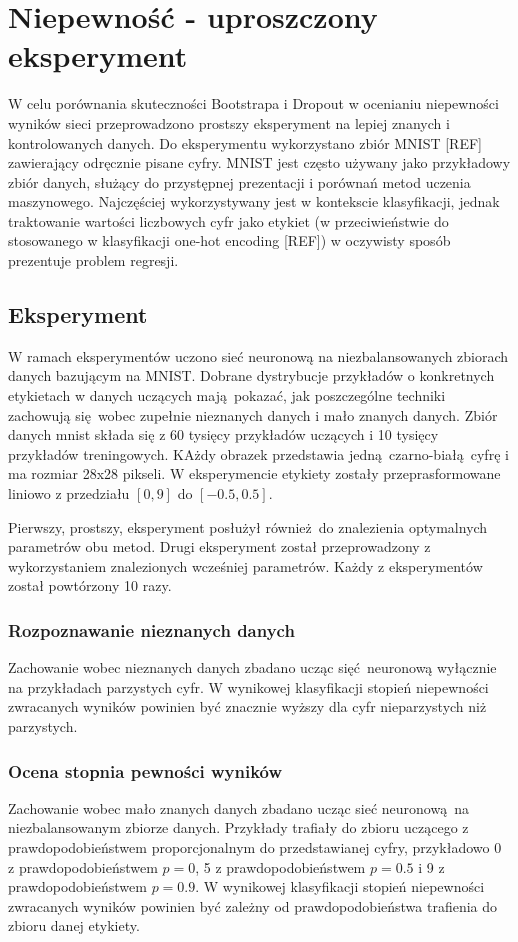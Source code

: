 \section{Niepewność - uproszczony eksperyment}
W celu porównania skuteczności Bootstrapa i Dropout w ocenianiu niepewności wyników sieci przeprowadzono prostszy eksperyment na lepiej znanych i kontrolowanych danych. Do eksperymentu wykorzystano zbiór MNIST [REF] zawierający odręcznie pisane cyfry. MNIST jest często używany jako przykładowy zbiór danych, służący do przystępnej prezentacji i porównań metod uczenia maszynowego. Najczęściej wykorzystywany jest w kontekscie klasyfikacji, jednak traktowanie wartości liczbowych cyfr jako etykiet (w przeciwieństwie do stosowanego w klasyfikacji one-hot encoding [REF]) w oczywisty sposób prezentuje problem regresji.    

\subsection{Eksperyment}
W ramach eksperymentów uczono sieć neuronową na niezbalansowanych zbiorach danych bazującym na MNIST. Dobrane dystrybucje przykładów o konkretnych etykietach w danych uczących mają pokazać, jak poszczególne techniki zachowują się wobec zupełnie nieznanych danych i mało znanych danych. Zbiór danych mnist składa się z 60 tysięcy przykładów uczących i 10 tysięcy przykładów treningowych. KAżdy obrazek przedstawia jedną czarno-białą cyfrę i ma rozmiar 28x28 pikseli. W eksperymencie etykiety zostały przeprasformowane liniowo z przedziału $[0,9]$ do $[-0.5,0.5]$.

Pierwszy, prostszy, eksperyment posłużył również do znalezienia optymalnych parametrów obu metod. Drugi eksperyment został przeprowadzony z wykorzystaniem znalezionych wcześniej parametrów. Każdy z eksperymentów został powtórzony 10 razy.

\subsubsection{Rozpoznawanie nieznanych danych}
Zachowanie wobec nieznanych danych zbadano ucząc sięć neuronową wyłącznie na przykładach parzystych cyfr. W wynikowej klasyfikacji stopień niepewności zwracanych wyników powinien być znacznie wyższy dla cyfr nieparzystych niż parzystych.


\subsubsection{Ocena stopnia pewności wyników}
Zachowanie wobec mało znanych danych zbadano ucząc sieć neuronową na niezbalansowanym zbiorze danych. Przykłady trafiały do zbioru uczącego z prawdopodobieństwem proporcjonalnym do przedstawianej cyfry, przykładowo 0 z prawdopodobieństwem $p=0$, 5 z prawdopodobieństwem $p=0.5$ i 9 z prawdopodobieństwem $p=0.9$. W wynikowej klasyfikacji stopień niepewności zwracanych wyników powinien być zależny od prawdopodobieństwa trafienia do zbioru danej etykiety.

